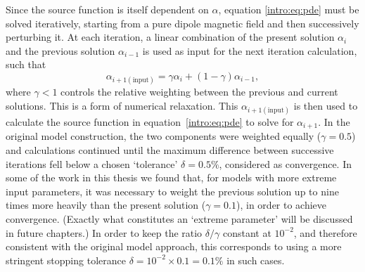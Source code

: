 Since the source function is itself dependent on $\alpha$, equation \ref{intro:eq:pde} must be solved iteratively, starting from a pure dipole magnetic field and then successively perturbing it. At each iteration, a linear combination of the present solution $\alpha_i$ and the previous solution $\alpha_{i-1}$ is used as input for the next iteration calculation, such that
\begin{equation}\label{intro:eq:convergence}
\alpha_{i+1\mathrm{(input)}} = \gamma\alpha_i + (1-\gamma)\alpha_{i-1},
\end{equation}
where $\gamma<1$ controls the relative weighting between the previous and current solutions. This is a form of numerical relaxation. This $\alpha_{i+1(\mathrm{input})}$ is then used to calculate the source function in equation~\ref{intro:eq:pde} to solve for $\alpha_{i+1}$. In the original model construction, the two components were weighted equally ($\gamma=0.5$) and calculations continued until the maximum difference between successive iterations fell below a chosen `tolerance' $\delta = 0.5\%$, considered as convergence. In some of the work in this thesis we found that, for models with more extreme input parameters, it was necessary to weight the previous solution up to nine times more heavily than the present solution ($\gamma=0.1$), in order to achieve convergence. (Exactly what constitutes an `extreme parameter' will be discussed in future chapters.) In order to keep the ratio $\delta/\gamma$ constant at $10^{-2}$, and therefore consistent with the original model approach, this corresponds to using a more stringent stopping tolerance $\delta = 10^{-2}\times0.1 = 0.1\%$ in such cases.

